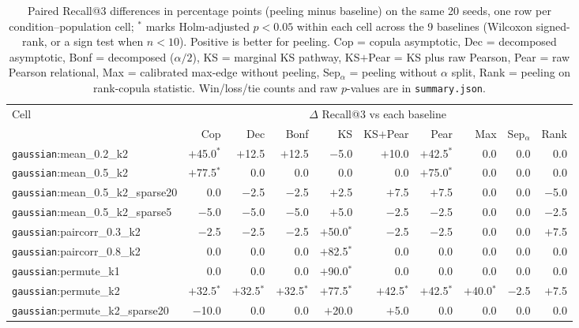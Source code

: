 \begin{table}[!tp]
\centering
\caption{Paired Recall@3 differences in percentage points (peeling minus baseline) on the same 20 seeds, one row per condition--population cell; $^{*}$ marks Holm-adjusted $p < 0.05$ within each cell across the 9 baselines (Wilcoxon signed-rank, or a sign test when $n < 10$). Positive is better for peeling. Cop = copula asymptotic, Dec = decomposed asymptotic, Bonf = decomposed ($\alpha/2$), KS = marginal KS pathway, KS$+$Pear = KS plus raw Pearson, Pear = raw Pearson relational, Max = calibrated max-edge without peeling, Sep$_\alpha$ = peeling without $\alpha$ split, Rank = peeling on rank-copula statistic. Win/loss/tie counts and raw $p$-values are in \textup{\texttt{summary.json}}.}
\label{tab:paired-tests}
\scriptsize
\renewcommand{\arraystretch}{0.86}
\begin{tabular*}{\textwidth}{@{\extracolsep{\fill}}lrrrrrrrrr}
\toprule
Cell & \multicolumn{9}{c}{$\Delta$ Recall@3 vs each baseline} \\
 & Cop & Dec & Bonf & KS & KS$+$Pear & Pear & Max & Sep$_\alpha$ & Rank \\
\midrule
\texttt{gaussian}:mean\_0.2\_k2 & $+$45.0$^{*}$ & $+$12.5 & $+$12.5 & $-$5.0 & $+$10.0 & $+$42.5$^{*}$ & 0.0 & 0.0 & 0.0 \\
\texttt{gaussian}:mean\_0.5\_k2 & $+$77.5$^{*}$ & 0.0 & 0.0 & 0.0 & 0.0 & $+$75.0$^{*}$ & 0.0 & 0.0 & 0.0 \\
\texttt{gaussian}:mean\_0.5\_k2\_sparse20 & 0.0 & $-$2.5 & $-$2.5 & $+$2.5 & $+$7.5 & $+$7.5 & 0.0 & 0.0 & $-$5.0 \\
\texttt{gaussian}:mean\_0.5\_k2\_sparse5 & $-$5.0 & $-$5.0 & $-$5.0 & $+$5.0 & $-$2.5 & $-$2.5 & 0.0 & 0.0 & $-$2.5 \\
\texttt{gaussian}:paircorr\_0.3\_k2 & $-$2.5 & $-$2.5 & $-$2.5 & $+$50.0$^{*}$ & $-$2.5 & $-$2.5 & 0.0 & 0.0 & $+$7.5 \\
\texttt{gaussian}:paircorr\_0.8\_k2 & 0.0 & 0.0 & 0.0 & $+$82.5$^{*}$ & 0.0 & 0.0 & 0.0 & 0.0 & 0.0 \\
\texttt{gaussian}:permute\_k1 & 0.0 & 0.0 & 0.0 & $+$90.0$^{*}$ & 0.0 & 0.0 & 0.0 & 0.0 & 0.0 \\
\texttt{gaussian}:permute\_k2 & $+$32.5$^{*}$ & $+$32.5$^{*}$ & $+$32.5$^{*}$ & $+$77.5$^{*}$ & $+$42.5$^{*}$ & $+$42.5$^{*}$ & $+$40.0$^{*}$ & $-$2.5 & $+$7.5 \\
\texttt{gaussian}:permute\_k2\_sparse20 & $-$10.0 & 0.0 & 0.0 & $+$20.0 & $+$5.0 & 0.0 & 0.0 & 0.0 & 0.0 \\

\end{tabular*}
\end{table}
